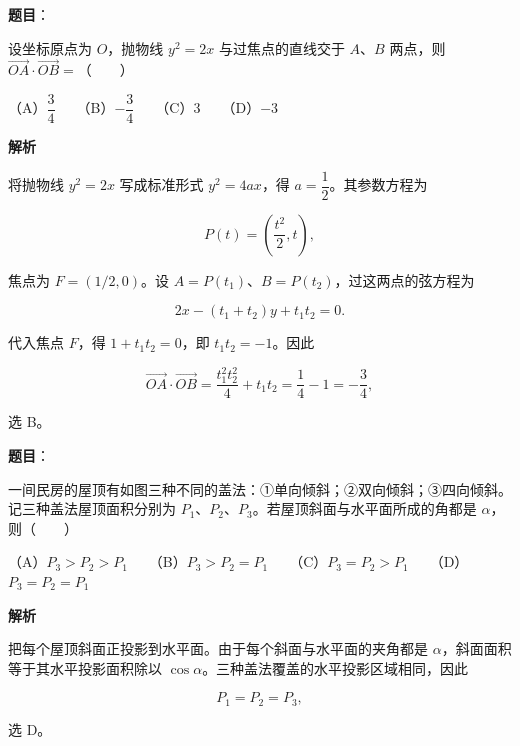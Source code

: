\begin{answer}

\textbf{题目}：

设坐标原点为 $O$，抛物线 $y^2=2x$ 与过焦点的直线交于 $A$、$B$ 两点，则 $\overrightarrow{OA}\cdot\overrightarrow{OB}=$\mbox{（　　）}

（A）$\dfrac34$　　（B）$-\dfrac34$　　（C）$3$　　（D）$-3$

\textbf{解析}

将抛物线 $y^2=2x$ 写成标准形式 $y^2=4ax$，得 $a=\dfrac12$。其参数方程为

\nopagebreak[4]
\[
P(t)=\left(\frac{t^2}{2},t\right),
\]

焦点为 $F=(1/2,0)$。设 $A=P(t_1)$、$B=P(t_2)$，过这两点的弦方程为

\nopagebreak[4]
\[
2x-(t_1+t_2)y+t_1t_2=0.
\]

代入焦点 $F$，得 $1+t_1t_2=0$，即 $t_1t_2=-1$。因此

\nopagebreak[4]
\[
\overrightarrow{OA}\cdot\overrightarrow{OB}
=\frac{t_1^2t_2^2}{4}+t_1t_2
=\frac14-1=-\frac34,
\]

选 B。


\end{answer}
\begin{answer}

\textbf{题目}：

一间民房的屋顶有如图三种不同的盖法：①单向倾斜；②双向倾斜；③四向倾斜。记三种盖法屋顶面积分别为 $P_1$、$P_2$、$P_3$。若屋顶斜面与水平面所成的角都是 $\alpha$，则\mbox{（　　）}
\nopagebreak[4]
\begin{center}\end{center}
\nopagebreak[4]
（A）$P_3>P_2>P_1$　　（B）$P_3>P_2=P_1$　　（C）$P_3=P_2>P_1$　　（D）$P_3=P_2=P_1$

\textbf{解析}

把每个屋顶斜面正投影到水平面。由于每个斜面与水平面的夹角都是 $\alpha$，斜面面积等于其水平投影面积除以 $\cos\alpha$。三种盖法覆盖的水平投影区域相同，因此

\nopagebreak[4]
\[
P_1=P_2=P_3,
\]

选 D。


\end{answer}
